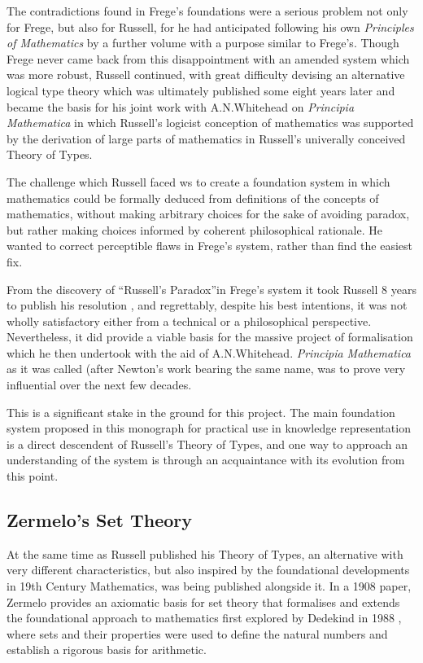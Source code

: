The contradictions found in Frege's foundations were a serious problem not only for Frege, but also for Russell, for he had anticipated following his own \emph{Principles of Mathematics}\cite{russell1903} by a further volume with a purpose similar to Frege's.
Though Frege never came back from this disappointment with an amended system which was more robust, Russell continued, with great difficulty devising an alternative logical type theory which was ultimately published some eight years later \cite{russell1908} and became the basis for his joint work with A.N.Whitehead on \emph{Principia Mathematica}\cite{whitehead1910} in which Russell's logicist conception of mathematics was supported by the derivation of large parts of mathematics in Russell's univerally conceived Theory of Types.

The challenge which Russell faced ws to create a foundation system in which mathematics could be formally deduced from definitions of the concepts of mathematics, without making arbitrary choices for the sake of avoiding paradox, but rather making choices informed by coherent philosophical rationale.
He wanted to correct perceptible flaws in Frege's system, rather than find the easiest fix.

From the discovery of ``Russell's Paradox''in Frege's system it took Russell 8 years to publish his resolution \cite{russell1908}, and regrettably, despite his best intentions, it was not wholly satisfactory either from a technical or a philosophical perspective.
Nevertheless, it did provide a viable basis for the massive project of formalisation which he then undertook with the aid of A.N.Whitehead.
\emph{Principia Mathematica} \cite{whitehead1910} as it was called (after Newton's work bearing the same name, was to prove very influential over the next few decades.

This is a significant stake in the ground for this project.
The main foundation system proposed in this monograph for practical use in knowledge representation is a direct descendent of Russell's Theory of Types, and one way to approach an understanding of the system is through an acquaintance with its evolution from this point.

\subsection{Zermelo's Set Theory}

At the same time as Russell published his Theory of Types, an alternative with very different characteristics, but also inspired by the foundational developments in 19th Century Mathematics, was being published alongside it.
In a 1908 paper, Zermelo\cite{zermelo1908} provides an axiomatic basis for set theory that formalises and extends the foundational approach to mathematics first explored by Dedekind in 1988 \cite{dedekind1888,dedekind1901}, where sets and their properties were used to define the natural numbers and establish a rigorous basis for arithmetic.

